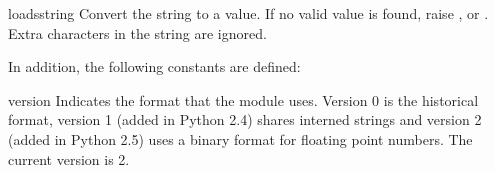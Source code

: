\begin{funcdesc}{loads}{string}
  Convert the string to a value.  If no valid value is found, raise
  ,  or
  .  Extra characters in the string are ignored.
\end{funcdesc}

In addition, the following constants are defined:

\begin{datadesc}{version}
  Indicates the format that the module uses. Version 0 is the
  historical format, version 1 (added in Python 2.4) shares interned
  strings and version 2 (added in Python 2.5) uses a binary format for
  floating point numbers. The current version is 2.

\end{datadesc}
